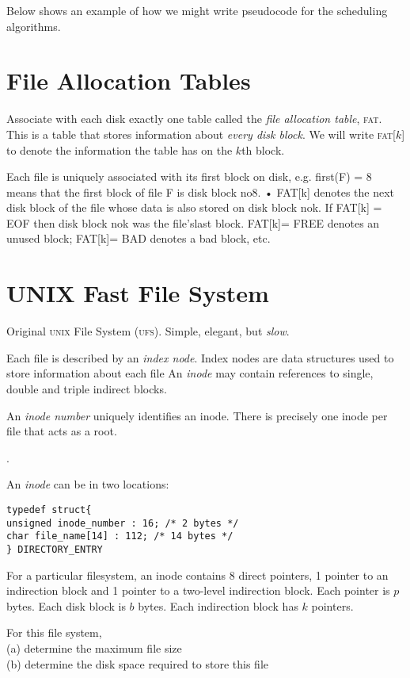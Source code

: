 \frmrule

Below shows an example of how we might write pseudocode for the scheduling algorithms.


\section{File Allocation Tables}

Associate with each disk exactly one table 
called the \textit{file allocation table}, \textsc{fat}.
This is a table that stores information about \textit{every disk block}. 
We will write \textsc{fat}[$k$] to denote the information the table has on the $k$th block.

Each file is uniquely associated with its ﬁrst block
on disk, e.g. ﬁrst(F) = 8 means that the ﬁrst block
of ﬁle F is disk block no8.
• FAT[k] denotes the next disk block of the ﬁle whose
data is also stored on disk block nok.
If FAT[k] = EOF then disk block nok was the ﬁle’slast block.
FAT[k]= FREE denotes an unused block; FAT[k]=
BAD denotes a bad block, etc.


\section{UNIX Fast File System}

Original \textsc{unix} File System (\textsc{ufs}).
Simple, elegant, but \textit{slow}.


Each file is described by an \textit{index node}.
Index nodes are data structures used to store information about each file
An \textit{inode} may contain references to single, double 
and triple indirect blocks.

An \textit{inode number} uniquely identiﬁes an inode.
There is precisely one inode per ﬁle that acts as a root.

.

An \textit{inode} can be in two locations:




\begin{lstlisting}
typedef struct{
unsigned inode_number : 16; /* 2 bytes */
char file_name[14] : 112; /* 14 bytes */
} DIRECTORY_ENTRY
\end{lstlisting}




\begin{example}
For a particular filesystem, an inode contains 8 direct pointers, 
1 pointer to an indirection block and 1 pointer to a 
two-level indirection block. 
Each pointer is $p$ bytes. Each disk block is $b$ bytes.
Each indirection block has $k$ pointers.

For this file system, \\
(a) determine the maximum file size \\
(b) determine the disk space required to store this file
\end{example}

